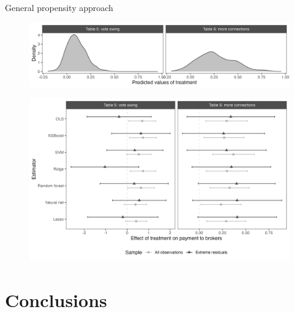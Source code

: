 \documentclass[10pt,table,aspectratio=169]{beamer}
\begin{document}
\begin{frame}[plain, label = two_dimensions]{General propensity approach}

\begin{figure}[H]
 \includegraphics[width=0.7\linewidth]{figures/observational_density_predicted.png}
\end{figure}\pause
\begin{figure}[H]
 \includegraphics[height=0.6\textheight]{figures/observational_coefplot_predicted.png}
\end{figure}

\end{frame}


\section{Conclusions}
\end{document}
